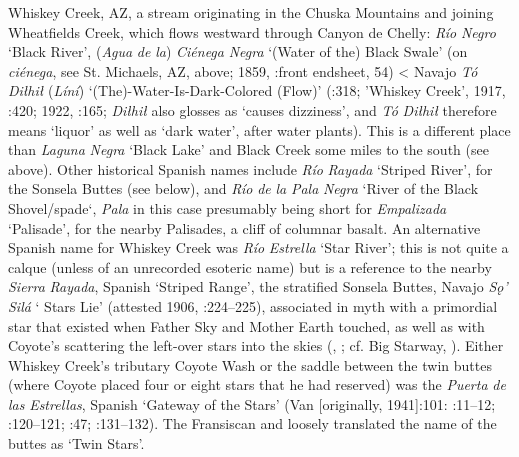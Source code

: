 Whiskey Creek, AZ, a stream originating in the Chuska Mountains and joining Wheatfields Creek, which flows westward through Canyon de Chelly:  \textit{Río} \textit{Negro} ‘Black River’, (\textit{Agua} \textit{de} \textit{la}) \textit{Ciénega} \textit{Negra} ‘(Water of the) Black Swale’ (on \textit{ciénega}, see St. Michaels, AZ, above; 1859, \citealt{Bailey1964a}:front endsheet, 54) < Navajo \textit{Tó} \textit{Diłhił} (\textit{Líní}) ‘(The)-Water-Is-Dark-Colored (Flow)’ (\citealt{Haile1951}:318; ’Whiskey Creek’, 1917, \citealt{Weber2004}:420; 1922, \citealt{Bodo1998}:165; \textit{Diłhił} also glosses as ‘causes dizziness’, and \textit{Tó} \textit{Diłhił} therefore means ‘liquor’ as well as ‘dark water’, after water plants).  This is a different place than \textit{Laguna} \textit{Negra} ‘Black Lake’ and Black Creek some miles to the south (see above).  Other historical Spanish names include \textit{Río} \textit{Rayada} ‘Striped River’, for the Sonsela Buttes (see below), and \textit{Río} \textit{de} \textit{la} \textit{Pala} \textit{Negra} ‘River of the Black Shovel/spade‘, \textit{Pala} in this case presumably being short for \textit{Empalizada} ‘Palisade’, for the nearby Palisades, a cliff of columnar basalt.  An alternative Spanish name for Whiskey Creek was \textit{Río} \textit{Estrella} ‘Star River’; this is not quite a calque (unless of an unrecorded esoteric name) but is a reference to the nearby \textit{Sierra} \textit{Rayada}, Spanish ‘Striped Range’, the stratified Sonsela Buttes, Navajo \textit{Sǫ'} \textit{Silá} ‘ Stars Lie’ (attested 1906, \citealt{Weber2004}:224–225), associated in myth with a primordial star that existed when Father Sky and Mother Earth touched, as well as with Coyote's scattering the left-over stars into the skies (\citealt{Salabye2013}, \citealt{SalabyeManolescu2013}; cf. Big Starway, \citealt{WheelwrightMcAllester1988}).  Either Whiskey Creek’s tributary Coyote Wash or the saddle between the twin buttes (where Coyote placed four or eight stars that he had reserved) was the \textit{Puerta} \textit{de} \textit{las} \textit{Estrellas}, Spanish ‘Gateway of the Stars’ (Van \citealt{Valkenburgh1999} [originally, 1941]:101: \citealt{Watson1964}:11–12; \citealt{Jett2001}:120–121; \citealt{McNitt1964}:47; \citealt{Linford2000}:131–132).  The Fransiscan \citet[134]{Fathers1910} and \citet[34]{Gregory1916} loosely translated the name of the buttes as ‘Twin Stars’.

